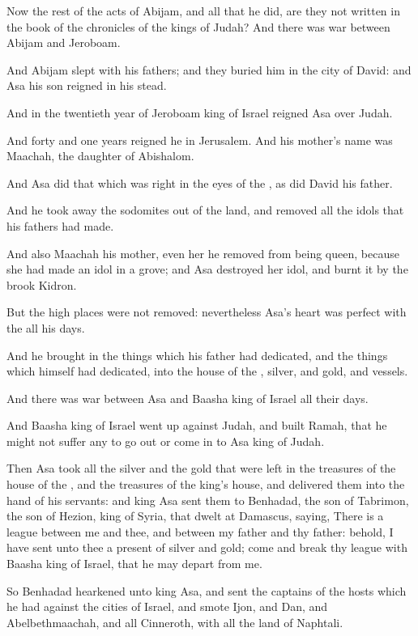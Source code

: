 \verse Now the rest of the acts of Abijam, and all that he did, are they not written in the book of the chronicles of the kings of Judah? And there was war between Abijam and Jeroboam.

\verse And Abijam slept with his fathers; and they buried him in the city of David: and Asa his son reigned in his stead.

\verse And in the twentieth year of Jeroboam king of Israel reigned Asa over Judah.

\verse And forty and one years reigned he in Jerusalem. And his mother's name was Maachah, the daughter of Abishalom.

\verse And Asa did that which was right in the eyes of the \LORD, as did David his father.

\verse And he took away the sodomites out of the land, and removed all the idols that his fathers had made.

\verse And also Maachah his mother, even her he removed from being queen, because she had made an idol in a grove; and Asa destroyed her idol, and burnt it by the brook Kidron.

\verse But the high places were not removed: nevertheless Asa's heart was perfect with the \LORD all his days.

\verse And he brought in the things which his father had dedicated, and the things which himself had dedicated, into the house of the \LORD, silver, and gold, and vessels.

\verse And there was war between Asa and Baasha king of Israel all their days.

\verse And Baasha king of Israel went up against Judah, and built Ramah, that he might not suffer any to go out or come in to Asa king of Judah.

\verse Then Asa took all the silver and the gold that were left in the treasures of the house of the \LORD, and the treasures of the king's house, and delivered them into the hand of his servants: and king Asa sent them to Benhadad, the son of Tabrimon, the son of Hezion, king of Syria, that dwelt at Damascus, saying, \verse There is a league between me and thee, and between my father and thy father: behold, I have sent unto thee a present of silver and gold; come and break thy league with Baasha king of Israel, that he may depart from me.

\verse So Benhadad hearkened unto king Asa, and sent the captains of the hosts which he had against the cities of Israel, and smote Ijon, and Dan, and Abelbethmaachah, and all Cinneroth, with all the land of Naphtali.


